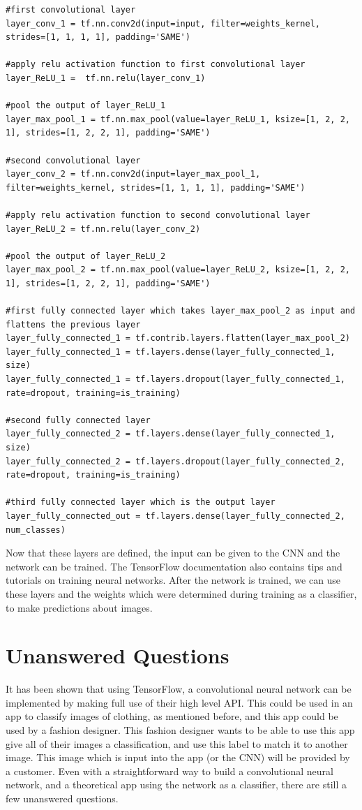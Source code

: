 \documentclass[12pt]{report} %
\begin{document}
\begin{verbatim}
#first convolutional layer
layer_conv_1 = tf.nn.conv2d(input=input, filter=weights_kernel, strides=[1, 1, 1, 1], padding='SAME')

#apply relu activation function to first convolutional layer
layer_ReLU_1 =  tf.nn.relu(layer_conv_1)

#pool the output of layer_ReLU_1
layer_max_pool_1 = tf.nn.max_pool(value=layer_ReLU_1, ksize=[1, 2, 2, 1], strides=[1, 2, 2, 1], padding='SAME')

#second convolutional layer
layer_conv_2 = tf.nn.conv2d(input=layer_max_pool_1, filter=weights_kernel, strides=[1, 1, 1, 1], padding='SAME')

#apply relu activation function to second convolutional layer
layer_ReLU_2 = tf.nn.relu(layer_conv_2)

#pool the output of layer_ReLU_2
layer_max_pool_2 = tf.nn.max_pool(value=layer_ReLU_2, ksize=[1, 2, 2, 1], strides=[1, 2, 2, 1], padding='SAME')

#first fully connected layer which takes layer_max_pool_2 as input and flattens the previous layer
layer_fully_connected_1 = tf.contrib.layers.flatten(layer_max_pool_2)
layer_fully_connected_1 = tf.layers.dense(layer_fully_connected_1, size)
layer_fully_connected_1 = tf.layers.dropout(layer_fully_connected_1, rate=dropout, training=is_training)

#second fully connected layer
layer_fully_connected_2 = tf.layers.dense(layer_fully_connected_1, size)
layer_fully_connected_2 = tf.layers.dropout(layer_fully_connected_2, rate=dropout, training=is_training)

#third fully connected layer which is the output layer
layer_fully_connected_out = tf.layers.dense(layer_fully_connected_2, num_classes)
\end{verbatim}

	Now that these layers are defined, the input can be given to the CNN and the network can be trained. The TensorFlow documentation also contains tips and tutorials on training neural networks\cite{tensorFlow}. After the network is trained, we can use these layers and the weights which were determined during training as a classifier, to make predictions about images.
	
\chapter{Unanswered Questions}
	It has been shown that using TensorFlow, a convolutional neural network can be implemented by making full use of their high level API. This could be used in an app to classify images of clothing, as mentioned before, and this app could be used by a fashion designer. This fashion designer wants to be able to use this app give all of their images a classification, and use this label to match it to another image. This image which is input into the app (or the CNN) will be provided by a customer. Even with a straightforward way to build a convolutional neural network, and a theoretical app using the network as a classifier, there are still a few unanswered questions.
	
\end{document}
